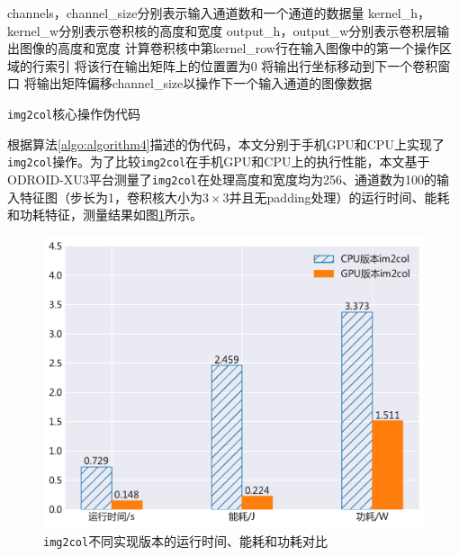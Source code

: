 \begin{algorithm}[htbp]
  \small
  \SetAlgoLined
    \begin{spacing}{0.8}
    channels，channel\_size分别表示输入通道数和一个通道的数据量\;
    kernel\_h，kernel\_w分别表示卷积核的高度和宽度\;
  output\_h，output\_w分别表示卷积层输出图像的高度和宽度\;
     {
         {
             {
                计算卷积核中第kernel\_row行在输入图像中的第一个操作区域的行索引\;
                 {
                     {
                         {
                            将该行在输出矩阵上的位置置为0\;
                        }
                    } 
                    将输出行坐标移动到下一个卷积窗口\;
                }
            }
        }
        将输出矩阵偏移channel\_size以操作下一个输入通道的图像数据\;
    }
    \end{spacing}
  \caption{\texttt{img2col}核心操作伪代码}
  \label{algo:algorithm4}
\end{algorithm}

根据算法\ref{algo:algorithm4}描述的伪代码，本文分别于手机GPU和CPU上实现了\texttt{img2col}操作。为了比较\texttt{img2col}在手机GPU和CPU上的执行性能，本文基于ODROID-XU3平台测量了\texttt{img2col}在处理高度和宽度均为256、通道数为100的输入特征图（步长为1，卷积核大小为$3 \times 3$并且无padding处理）的运行时间、能耗和功耗特征，测量结果如图\ref{figure:figure11}所示。

\begin{figure}[htbp]
    \begin{center}
    \includegraphics[height=0.4\textwidth]{figures/im2col_energy.pdf}
    \end{center}
    \caption{\texttt{img2col}不同实现版本的运行时间、能耗和功耗对比}\label{figure:figure11}
\end{figure}

